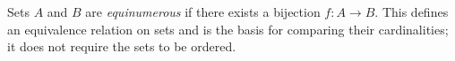 
Sets $A$ and $B$ are \emph{equinumerous} if there exists a bijection $f:A\to B$. This defines an equivalence relation on sets and is the basis for comparing their cardinalities; it does not require the sets to be ordered.
